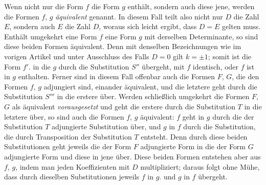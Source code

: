 Wenn nicht nur die Form $f$ die Form $g$ enthält, sondern auch diese jene, werden die Formen $f$, $g$ \textit{äquivalent} genannt. In diesem Fall teilt also nicht nur $D$ die Zahl $E$, sondern auch $E$ die Zahl $D$, woraus sich leicht ergibt, dass $D=E$ gelten muss. Enthält umgekehrt eine Form $f$ eine Form $g$ mit derselben Determinante, so sind diese beiden Formen äquivalent. Denn mit denselben Bezeichnungen wie im vorigen Artikel und unter Ausschluss des Falls $D=0$ gilt $k=\pm1$; somit ist die Form $f'$. in die $g$ durch die Substitution $S''$ übergeht, mit $f$ identisch, oder $f$ ist in $g$ enthalten. Ferner sind in diesem Fall offenbar auch die Formen $F$, $G$, die den Formen $f$, $g$ adjungiert sind, einander äquivalent, und die letztere geht durch die Substitution $S'''$ in die erstere über. Werden schließlich umgekehrt die Formen $F$, $G$ als äquivalent \textit{vorausgesetzt} und geht die erstere durch die Substitution $T$ in die letztere über, so sind auch die Formen $f$, $g$ äquivalent: $f$ geht in $g$ durch die der Substitution $T$ adjungierte Substitution über, und $g$ in $f$ durch die Substitution, die durch Transposition der Substitution $T$ entsteht. Denn durch diese beiden Substitutionen geht jeweils die der Form $F$ adjungierte Form in die der Form $G$ adjungierte Form und diese in jene über. Diese beiden Formen entstehen aber aus $f$, $g$, indem man jeden Koeffizienten mit $D$ multipliziert; daraus folgt ohne Mühe, dass durch dieselben Substitutionen jeweils $f$ in $g$. und $g$ in $f$ übergeht.

